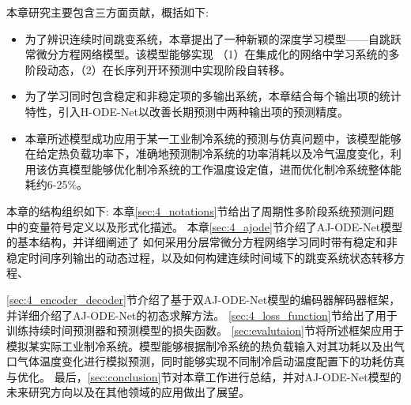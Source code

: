 本章研究主要包含三方面贡献，概括如下:
\begin{itemize}
    \item 为了辨识连续时间跳变系统，本章提出了一种新颖的深度学习模型——自跳跃常微分方程网络模型。该模型能够实现
    （1）在集成化的网络中学习系统的多阶段动态，（2）在长序列开环预测中实现阶段自转移。
    \item 为了学习同时包含稳定和非稳定项的多输出系统，本章结合每个输出项的统计特性，引入H-ODE-Net以改善长期预测中两种输出项的预测精度。
    \item 本章所述模型成功应用于某一工业制冷系统的预测与仿真问题中，该模型能够在给定热负载功率下，准确地预测制冷系统的功率消耗以及冷气温度变化，利用该仿真模型能够优化制冷系统的工作温度设定值，进而优化制冷系统整体能耗约6-25\%。
\end{itemize}

本章的结构组织如下:
本章\ref{sec:4_notations}节给出了周期性多阶段系统预测问题中的变量符号定义以及形式化描述。
本章\ref{sec:4_ajode}节介绍了AJ-ODE-Net模型的基本结构，并详细阐述了
如何采用分层常微分方程网络学习同时带有稳定和非稳定时间序列输出的动态过程，以及如何构建连续时间域下的跳变系统状态转移方程、

\ref{sec:4_encoder_decoder}节介绍了基于双AJ-ODE-Net模型的编码器解码器框架，并详细介绍了AJ-ODE-Net的初态求解方法。
\ref{sec:4_loss_function}节给出了用于训练持续时间预测器和预测模型的损失函数。
\ref{sec:evalutaion}节将所述框架应用于模拟某实际工业制冷系统。模型能够根据制冷系统的热负载输入对其功耗以及出气口气体温度变化进行模拟预测，同时能够实现不同制冷启动温度配置下的功耗仿真与优化。
最后，\ref{sec:conclusion}节对本章工作进行总结，并对AJ-ODE-Net模型的未来研究方向以及在其他领域的应用做出了展望。


